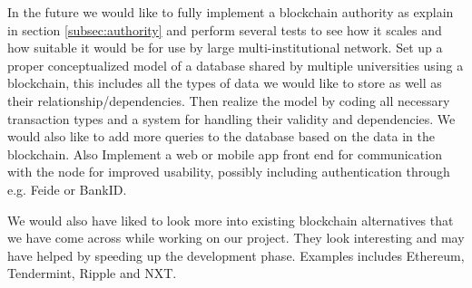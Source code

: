 \documentclass[12pt]{article}
\begin{document}
In the future we would like to fully implement a blockchain authority as explain in section \ref{subsec:authority} and perform several tests to see how it scales and how suitable it would be for use by large multi-institutional network. Set up a proper conceptualized model of a database shared by multiple universities using a blockchain, this includes all the types of data we would like to store as well as their relationship/dependencies. Then realize the model by coding all necessary transaction types and a system for handling their validity and dependencies. We would also like to add more queries to the database based on the data in the blockchain. Also Implement a web or mobile app front end for communication with the node for improved usability, possibly including authentication through e.g. Feide or BankID.

We would also have liked to look more into existing blockchain alternatives  that we have come across while working on our project. They look interesting and may have helped by speeding up the development phase. Examples includes Ethereum\cite{ethereum2016}, Tendermint\cite{tendermint2016}, Ripple\cite{ripple2016} and NXT\cite{nxt2016}.

\newpage
 

\listoffigures
\end{document}
